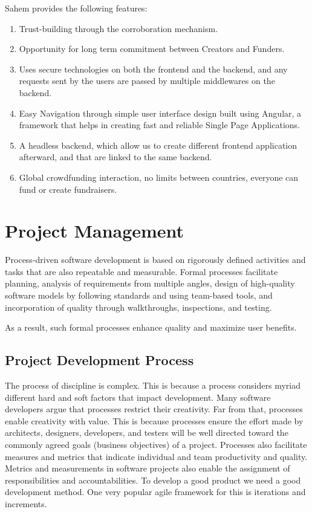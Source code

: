 Sahem provides the following features:
\begin{enumerate}
      \item Trust-building through the corroboration mechanism.
      \item
            Opportunity for long term commitment between Creators and Funders.
      \item
            Uses secure technologies on both the frontend and the backend, and any requests sent by the users are passed by multiple middlewares on the backend.
      \item
            Easy Navigation through simple user interface design built using Angular, a framework that helps in creating fast and reliable Single Page Applications.
      \item
            A headless backend, which allow us to create different frontend application afterward, and that are linked to the same backend.
      \item
            Global crowdfunding interaction, no limits between countries, everyone can fund or create fundraisers.
\end{enumerate}
\section{ Project Management }
Process-driven software development is based on rigorously defined activities and tasks that are also repeatable and measurable. Formal processes facilitate planning, analysis of requirements from multiple angles, design of high-quality software models by following standards and using team-based tools, and incorporation of quality through walkthroughs, inspections, and testing.

As a result, such formal processes enhance quality and maximize user benefits.
\subsection{ Project Development Process }
The process of discipline is complex. This is because a process considers myriad different hard and soft factors that impact development. Many software developers argue that processes restrict their creativity. Far from that, processes enable creativity with value. This is because processes ensure the effort made by architects, designers, developers, and testers will be well directed toward the commonly agreed goals (business objectives) of a project. Processes also facilitate measures and metrics that indicate individual and team productivity and quality. Metrics and measurements in software projects also enable the assignment of responsibilities and accountabilities.
To develop a good product we need a good development method. One very popular agile framework for this is iterations and increments.\\

